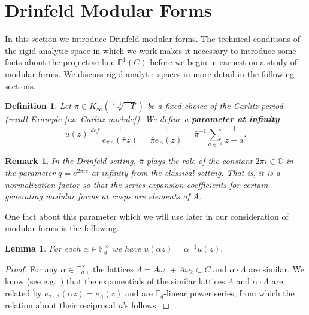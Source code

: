 \documentclass[11pt]{amsart}
\newtheorem{lemma}[theorem]{Lemma}
\newtheorem{definition}[theorem]{Definition}
\newtheorem{remark}[theorem]{Remark}
\theoremstyle{definition}
\numberwithin{equation}{section}
\newcommand{\bbC}{\mathbb{C}}		%
\newcommand{\bbF}{\mathbb{F}}		%
\newcommand{\bbP}{\mathbb{P}}		%
\begin{document}
		
		\section{Drinfeld Modular Forms}
		
		In this section we introduce Drinfeld modular forms. The technical conditions of the rigid analytic space in which we work makes it necessary to introduce some facts about the projective line $\bbP^1(C)$ before we begin in earnest on a study of modular forms. We discuss rigid analytic spaces in more detail in the following sections.
		
		\begin{definition}\label{d: parameter at infty}
			Let $\overline{\pi}\in K_{\infty}(\sqrt[q-1]{-T})$ be a fixed choice of the Carlitz period (recall Example \ref{ex: Carlitz module}). We define a \textbf{parameter at infinity} 
			\[u(z)\overset{def}{=}\frac{1}{e_{\overline{\pi}A}(\bar{\pi}z)}=\frac{1}{\bar{\pi}e_A(z)}=\bar{\pi}^{-1}\sum_{a\in A}\frac{1}{z+a}.\]
		\end{definition}
		\begin{remark}
			In the Drinfeld setting, $\overline{\pi}$ plays the role of the constant $2\pi i\in \bbC$ in the parameter $q=e^{2\pi i z}$ at infinity from the classical setting. That is, it is a normalization  factor so that the series expansion coefficients for certain generating modular forms at cusps are elements of $A.$ 
		\end{remark}
		
		One fact about this parameter which we will use later in our consideration of modular forms is the following. 
		\begin{lemma}\cite[Page $494$]{Gekeler-survey-Drinfeld-modular-forms}\label{l: u(a/d)=d/au}
			For each $\alpha\in \bbF_q^{\times}$ we have $\displaystyle{u\left(\alpha z\right)=\alpha^{-1}u(z)}.$
		\end{lemma}	
		\begin{proof}
			For any $\alpha \in \bbF_q^{\times},$ the lattices $\Lambda = A\omega_1+A\omega_2\subset C$ and $\alpha\cdot \Lambda$ are similar. We know (see e.g.\ \cite[$(2.2.\mathrm{iv})$]{Gekeler-Curves}) that the exponentials of the similar lattices $\Lambda$ and $\alpha\cdot \Lambda$ are related by $e_{\alpha\cdot\Lambda}(\alpha z)=e_{\Lambda}(z)$ and are $\bbF_q$-linear power series, from which the relation about their reciprocal $u$'s follows. 
			
		\end{proof}
		
\end{document}
